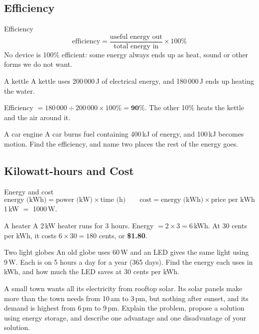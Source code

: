 \subsection{Efficiency}\label{sub:a4.1}

\begin{skillbox}{Efficiency}
\[ \text{efficiency} = \frac{\text{useful energy out}}{\text{total energy in}} \times 100\% \]
No device is 100\% efficient: some energy always ends up as heat, sound or other forms we do not want.
\end{skillbox}

\begin{workedex}{A kettle}
A kettle uses 200\,000\,J of electrical energy, and 180\,000\,J ends up heating the water.

\smallskip
Efficiency $= 180\,000 \div 200\,000 \times 100\% = \mathbf{90\%}$. The other 10\% heats the kettle and the air around it.
\end{workedex}

\begin{wedo}{A car engine}
A car burns fuel containing 400\,kJ of energy, and 100\,kJ becomes motion. Find the efficiency, and name two places the rest of the energy goes.
\workbox{4.5cm}
\end{wedo}

\subsection{Kilowatt-hours and Cost}\label{sub:a4.2}

\begin{skillbox}{Energy and cost}
\[ \text{energy (kWh)} = \text{power (kW)} \times \text{time (h)} \qquad \text{cost} = \text{energy (kWh)} \times \text{price per kWh} \]
1\,kW $=$ 1000\,W.
\end{skillbox}

\begin{workedex}{A heater}
A 2\,kW heater runs for 3 hours. Energy $= 2 \times 3 = 6$\,kWh. At 30 cents per kWh, it costs $6 \times 30 = 180$ cents, or \textbf{\$1.80}.
\end{workedex}

\begin{wedo}{Two light globes}
An old globe uses 60\,W and an LED gives the same light using 9\,W. Each is on 5 hours a day for a year (365 days). Find the energy each uses in kWh, and how much the LED saves at 30 cents per kWh.
\workbox{6cm}
\end{wedo}

\label{prac:4}


\label{ext:4}

\task A small town wants all its electricity from rooftop solar. Its solar panels make more than the town needs from 10\,am to 3\,pm, but nothing after sunset, and its demand is highest from 6\,pm to 9\,pm. Explain the problem, propose a solution using energy storage, and describe one advantage and one disadvantage of your solution.
\answerbox{9cm}

\clearpage

